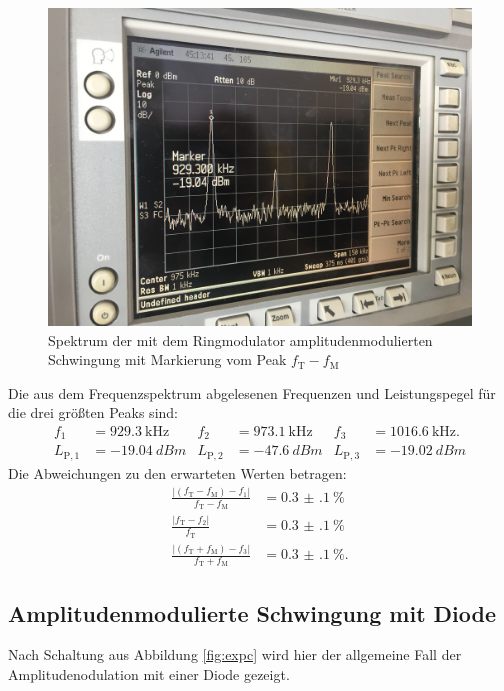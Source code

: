 \begin{figure}[h]
  \includegraphics[width=.9\textwidth]{Spektrum_Pics/b1.jpg}
  \caption{Spektrum der mit dem Ringmodulator amplitudenmodulierten Schwingung mit Markierung vom Peak $f_\text{T} - f_\text{M}$}
  \label{fig:b1}
\end{figure}


Die aus dem Frequenzspektrum abgelesenen Frequenzen und Leistungspegel für die drei größten Peaks sind:
\begin{align*}
  f_1 &= \SI{929.3}{\kilo\hertz} & f_2 &= \SI{973.1}{\kilo\hertz} & f_3 &= \SI{1016.6}{\kilo\hertz}.\\
  L_{\text{P}, 1} &= \SI{-19.04}{dBm} & L_{\text{P}, 2} &= \SI{-47.6}{dBm} & L_{\text{P}, 3} &= \SI{-19.02}{dBm}
\end{align*}
Die Abweichungen zu den erwarteten Werten betragen:
\begin{align*}
  \frac{|(f_\text{T} - f_\text{M}) - f_1|}{f_\text{T} - f_\text{M}} &= \SI{0.3(1)}{\percent}\\
  \frac{|f_\text{T} - f_2|}{f_\text{T}} &= \SI{0.3(1)}{\percent}\\
  \frac{|(f_\text{T} + f_\text{M}) - f_3|}{f_\text{T} + f_\text{M}} &= \SI{0.3(1)}{\percent}.
\end{align*}

\subsection{Amplitudenmodulierte Schwingung mit Diode}
\label{sec:amplModDiode}

Nach Schaltung aus Abbildung \ref{fig:expc} wird hier der allgemeine Fall der Amplitudenodulation mit einer Diode gezeigt.

